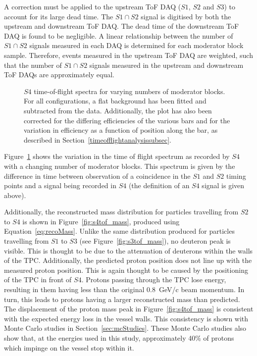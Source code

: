 A correction must be applied to the upstream ToF DAQ ($\mathit{S1}$, $\mathit{S2}$ and $\mathit{S3}$) to account for its large dead time.
The $\mathit{S1} \cap \mathit{S2}$ signal is digitised by both the upstream and downstream ToF DAQ.
The dead time of the downstream ToF DAQ is found to be negligible.
A linear relationship between the number of $\mathit{S1} \cap \mathit{S2}$ signals measured in each DAQ is determined for each moderator block sample.
Therefore, events measured in the upstream ToF DAQ are weighted, such that the number of $\mathit{S1} \cap \mathit{S2}$ signals measured in the upstream and downstream ToF DAQs are approximately equal.

\begin{figure}[h]
  \begin{adjustbox}{max totalsize={.83\textwidth}{.5\textheight},center}
    
  \end{adjustbox}
  \caption{$\mathit{S4}$ time-of-flight spectra for varying numbers of moderator blocks. For all configurations, a flat background has been fitted and subtracted from the data. Additionally, the plot has also been corrected for the differing efficiencies of the various bars and for the variation in efficiency as a function of position along the bar, as described in Section~\ref{timeofflightanalysissubsec}.}
  \label{fig:s4tof}	
\end{figure}

Figure~\ref{fig:s4tof} shows the variation in the time of flight spectrum as recorded by $\mathit{S4}$ with a changing number of moderator blocks.
This spectrum is given by the difference in time between observation of a coincidence in the $\mathit{S1}$ and $\mathit{S2}$ timing points and a signal being recorded in $\mathit{S4}$ (the definition of an $\mathit{S4}$ signal is given above).

Additionally, the reconstructed mass distribution for particles travelling from $\mathit{S2}$ to $\mathit{S4}$ is shown in Figure~\ref{fig:s4tof_mass}, produced using Equation~\ref{eq:recoMass}.
Unlike the same distribution produced for particles travelling from $\mathit{S1}$ to $\mathit{S3}$ (see Figure~\ref{fig:s3tof_mass}), no deuteron peak is visible.
This is thought to be due to the attenuation of deuterons within the walls of the TPC.
Additionally, the predicted proton position does not line up with the measured proton position. 
This is again thought to be caused by the positioning of the TPC in front of $\mathit{S4}$.
Protons passing through the TPC lose energy, resulting in them having less than the original 0.8~GeV/c beam momentum.
In turn, this leads to protons having a larger reconstructed mass than predicted.
The displacement of the proton mass peak in Figure~\ref{fig:s4tof_mass} is consistent with the expected energy loss in the vessel walls.
This consistency is shown with Monte Carlo studies in Section~\ref{sec:mcStudies}.
These Monte Carlo studies also show that, at the energies used in this study, approximately 40\% of protons which impinge on the vessel stop within it.

